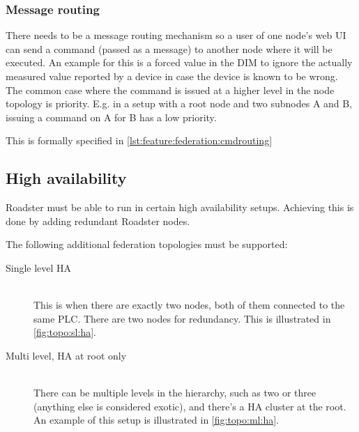 \subsubsection{Message routing}
There needs to be a message routing mechanism so a user
of one node's web UI can send a command (passed as a message) to another node where it will be
executed. An example for this is a forced value in the DIM to ignore the
actually measured value reported by a device in case the device is known to be
wrong. The common case where the command is issued at a higher level in the node
topology is priority. E.g. in a setup with a root node and two
subnodes A and B, issuing a command on A for B has a low priority.

This is formally specified in \autoref{lst:feature:federation:cmdrouting}

\subsection{High availability}
Roadster must be able to run in certain high availability setups. Achieving
this is done by adding redundant Roadster nodes.

The following additional federation topologies must be supported:
\begin{description}
	\item [ Single level \gls{HA} ] \hfill\\
		This is when there are exactly two nodes, both of them
		connected to the same PLC. There are two nodes for redundancy. This is illustrated in
		\autoref{fig:topo:sl:ha}.

	\item [ Multi level, \gls{HA} at root only ] \hfill\\
		There can be multiple levels in the hierarchy, such as two or
		three (anything else is considered exotic), and there's a HA
		cluster at the root. An example of this setup is illustrated in
		\autoref{fig:topo:ml:ha}.
\end{description}

